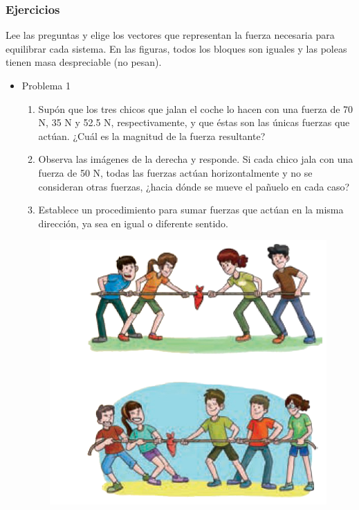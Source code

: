 \documentclass[11pt]{book}
\begin{document}
\subsubsection{Ejercicios}
Lee las preguntas y elige los vectores que representan la fuerza necesaria para
equilibrar cada sistema. En las figuras, todos los bloques son iguales
y las poleas tienen masa despreciable (no pesan).
\begin{itemize}
    \item Problema 1
          \begin{boxK}
              \begin{minipage}[t]{0.65\textwidth}
                  \footnotesize
                  \begin{enumerate}
                      \item Supón que los tres chicos que jalan el coche lo hacen con una fuerza
                            de 70 N, 35 N y 52.5 N, respectivamente, y que éstas son las únicas
                            fuerzas que actúan.
                            ¿Cuál es la magnitud de la fuerza resultante?
                      \item Observa las imágenes de la derecha y responde.
                            Si cada chico jala con una fuerza de 50 N, todas las fuerzas actúan
                            horizontalmente y no se consideran otras fuerzas, ¿hacia dónde se
                            mueve el pañuelo en cada caso?
                      \item Establece un procedimiento para sumar fuerzas que actúan en la misma
                            dirección, ya sea en igual o diferente sentido.
                  \end{enumerate}
              \end{minipage}\hfill
              \begin{minipage}[t]{0.3\linewidth}
                  \begin{figure}[H]
                      \centering
                      \includegraphics[width=\linewidth]{cuerda_ninios.png}

\end{figure}
\end{minipage}
\end{boxK}
\end{itemize}
\end{document}
